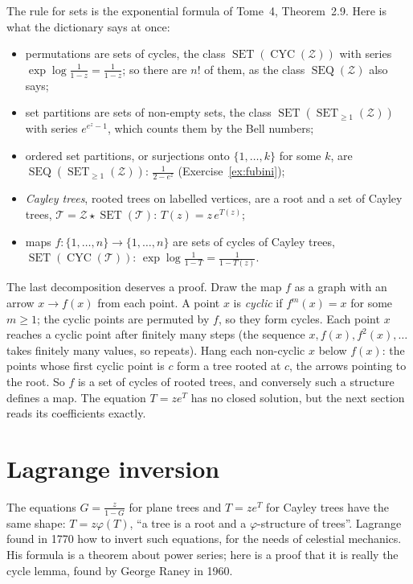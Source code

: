 The rule for sets is the exponential formula of Tome~4, Theorem~2.9. Here is what the dictionary says at once:
\begin{itemize}
\item permutations are sets of cycles, the class $\operatorname{SET}(\operatorname{CYC}(\mathcal Z))$ with series $\exp\log\frac1{1-z}=\frac1{1-z}$; so there are $n!$ of them, as the class $\operatorname{SEQ}(\mathcal Z)$ also says;
\item set partitions are sets of non-empty sets, the class $\operatorname{SET}(\operatorname{SET}_{\ge1}(\mathcal Z))$ with series $e^{e^z-1}$, which counts them by the Bell numbers;
\item ordered set partitions, or surjections onto $\{1,\dots,k\}$ for some $k$, are $\operatorname{SEQ}(\operatorname{SET}_{\ge1}(\mathcal Z))$: $\frac1{2-e^z}$ (Exercise~\ref{ex:fubini});
\item \emph{Cayley trees}, rooted trees on labelled vertices, are a root and a set of Cayley trees, $\mathcal T=\mathcal Z\star\operatorname{SET}(\mathcal T)$: $T(z)=z\,e^{T(z)}$;
\item maps $f:\{1,\dots,n\}\to\{1,\dots,n\}$ are sets of cycles of Cayley trees, $\operatorname{SET}(\operatorname{CYC}(\mathcal T))$: $\exp\log\frac1{1-T}=\frac1{1-T(z)}$.
\end{itemize}
The last decomposition deserves a proof. Draw the map $f$ as a graph with an arrow $x\to f(x)$ from each point. A point $x$ is \emph{cyclic} if $f^m(x)=x$ for some
$m\ge1$; the cyclic points are permuted by $f$, so they form cycles. Each point $x$ reaches a cyclic point after finitely many steps (the
sequence $x,f(x),f^2(x),\dots$ takes finitely many values, so repeats). Hang each non-cyclic $x$ below $f(x)$: the points whose first cyclic
point is $c$ form a tree rooted at $c$, the arrows pointing to the root. So $f$ is a set of cycles of rooted trees, and conversely such a
structure defines a map. The equation $T=ze^T$ has no closed solution, but the next section reads its coefficients exactly.

\section{Lagrange inversion}

The equations $G=\frac z{1-G}$ for plane trees and $T=ze^T$ for Cayley trees have the same shape: $T=z\varphi(T)$, ``a tree is a root and a
$\varphi$-structure of trees''. Lagrange found in 1770 how to invert such equations, for the needs of celestial mechanics. His formula is
a theorem about power series; here is a proof that it is really the cycle lemma, found by George Raney in 1960.

